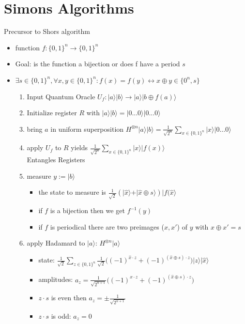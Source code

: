 \documentclass[12pt,a4paper]{article}
\newcommand{\ecb}[1]{\{#1\}}
\newcommand{\ket}[1]{\vert #1 \rangle}
\begin{document}
\section{Simons Algorithms}
Precursor to Shors algorithm
\begin{itemize}
\item function $f : \ecb{0,1}^n \rightarrow \ecb{0,1}^n$
\item Goal: is the function a bijection or does f have a period $s$
\item $\exists s\in\ecb{0,1}^n, \forall x,y\in\ecb{0,1}^n: f(x) = f(y) \leftrightarrow x\oplus y \in \ecb{0^n,s}$
\begin{enumerate}
\item Input Quantum Oracle $U_f: \ket{a}\ket{b} \rightarrow \ket{a}\ket{b\oplus f(a)}$
\item Initialize register $R$ with $\ket{a}\ket{b}=\ket{0...0}\ket{0...0}$
\item bring $a$ in uniform superposition $H^{\otimes n} \ket{a} \ket{b} = \displaystyle \frac{1}{\sqrt{2^n}} \sum_{x\in\ecb{0,1}^n} \ket{x}\ket{0...0}$
\item apply $U_f$ to $R$ yields $\displaystyle \frac{1}{\sqrt{2^n}} \sum_{x\in\ecb{0,1}^n} \ket{x}\ket{f(x)}$\\Entangles Registers
\item measure $y:=\ket{b}$
\begin{itemize}
\item the state to measure is $\frac{1}{\sqrt{2}} (\ket{\hat{x}}+\ket{\hat{x}\oplus s})\ket{f(\hat{x}}$
\item if $f$ is a bijection then we get $f^{-1}(y)$
\item if $f$ is periodical there are two preimages ($x, x'$) of $y$ with $x\oplus x' = s$
\end{itemize}
\item apply Hadamard to $\ket{a}$: $H^{\otimes n}\ket{a}$
\begin{itemize}
\item state: $\displaystyle \frac{1}{\sqrt{2}}\sum_{z\in\ecb{0,1}^n} \frac{1}{\sqrt{2}}\big( (-1)^{\hat{x}\cdot z} + (-1)^{(\hat{x}\oplus s)\cdot z}\big ) \ket{z}\ket{\hat{x}}$
\item amplitudes: $a_z = \frac{1}{\sqrt{2^{n+1}}}\big( (-1)^{\hat{x}\cdot z} + (-1)^{(\hat{x}\oplus s)\cdot z}\big )$
\item $z\cdot s$ is even then $a_z = \pm \frac{1}{\sqrt{2^{n+1}}}$
\item $z\cdot s$ is odd: $a_z = 0$
\end{itemize}

\end{enumerate}
\end{itemize}
\end{document}
